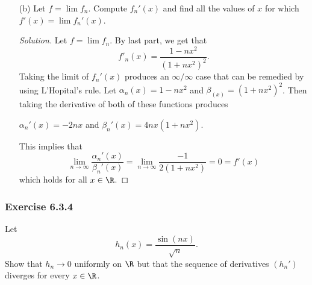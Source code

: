 \begin{enumerate}
\begin{proof}[Solution]
        To show that \( (f_n)  \) converges uniformly on \( \R  \), it is enough to show that \( (f_n)  \) satisfies the Cauchy Criterion. First, we observe that the sequence \( \alpha_n = \frac{ 1 }{ \sqrt{2n }  }  \) is a Cauchy sequence. Hence, choose \( N \in \N  \) such that for any \( n,m \geq N  \), we have that 
        \begin{align*}
            | f_n(x) - f_m(x)  | &= \Big| \frac{ x }{ 1 + nx^2  } - \frac{ x  }{  1 + mx^2  }  \Big|   \\
                                 &\leq \frac{ 1 }{ 2 } \Big|  \frac{ 1 }{ \sqrt{ n }  } - \frac{ 1 }{ \sqrt{ m }  }  \Big| \\
                                 &< \frac{ 1 }{ 2 } \cdot 2 \epsilon = \epsilon. 
        \end{align*}
        Since \( (f_n)  \) satisfies the Cauchy Criterion, we must have a uniform convergence of \( (f_n)  \) to \( f  \). Letting \(  n \to \infty   \), we get that the limit function \( f  \) is just \( f = 0  \).
        \end{proof}
    \item[(b)] Let \( f = \lim f_n  \). Compute \( f_n'(x)  \) and find all the values of \( x  \) for which \( f'(x) = \lim f_n'(x)  \).
        \begin{proof}[Solution]
        Let \( f = \lim f_n  \). By last part, we get that 
        \[  f'_n(x) = \frac{ 1 - nx^2  }{ (1 +nx^2)^2 }.  \]
        Taking the limit of \( f_n'(x)  \) produces an \( \infty / \infty   \) case that can be remedied by using L'Hopital's rule. Let \( \alpha_n (x) = 1 - nx^2  \) and \( \beta_ (x) =  (1+nx^2)^2\). Then taking the derivative of both of these functions produces 
        \begin{center}
            \( \alpha_n'(x) = -2nx  \) and \( \beta_n'(x) = 4nx(1+nx^2 )  \).
        \end{center}
        This implies that 
        \[  \lim_{n \to \infty } \frac{ \alpha_n'(x) }{ \beta_n'(x)  } = \lim_{ n \to \infty  } \frac{ -1 }{ 2(1+nx^2) } = 0 = f'(x)  \]
        which holds for all \( x \in \R  \).
        \end{proof}

\end{enumerate}

\subsubsection{Exercise 6.3.4} Let 
\[  h_n(x) = \frac{ \sin(nx)  }{ \sqrt{ n }  }.\]
Show that \( h_n \to 0  \) uniformly on \( \R  \) but that the sequence of derivatives \( (h_n') \) diverges for every \( x \in \R  \).

